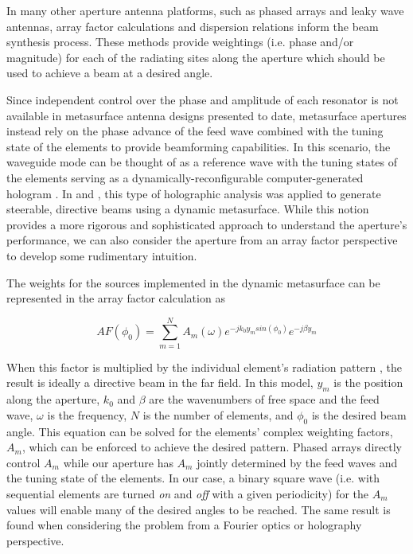 \documentclass[journal]{IEEEtran}
\begin{document}
In many other aperture antenna platforms, such as phased arrays and leaky wave antennas, array factor calculations \cite{balanis2005antenna} and dispersion relations \cite{oliner1993leaky} inform the beam synthesis process. These methods provide weightings (i.e. phase and/or magnitude) for each of the radiating sites along the aperture which should be used to achieve a beam at a desired angle.

Since independent control over the phase and amplitude of each resonator is not available in metasurface antenna designs presented to date, metasurface apertures instead rely on the phase advance of the feed wave combined with the tuning state of the elements to provide beamforming capabilities. In this scenario, the waveguide mode can be thought of as a reference wave with the tuning states of the elements serving as a dynamically-reconfigurable computer-generated hologram \cite{goodmanFourierOptics}. In \cite{johnson2015sidelobeCancel} and \cite{johnson2014DDA_ApOp}, this type of holographic analysis was applied to generate steerable, directive beams using a dynamic metasurface. While this notion provides a more rigorous and sophisticated approach to understand the aperture's performance, we can also consider the aperture from an array factor perspective to develop some rudimentary intuition.

The weights for the sources implemented in the dynamic metasurface can be represented in the array factor calculation as

\begin{equation}
AF(\phi_0) = \sum_{m=1}^N A_m(\omega) e^{-j k_0 y_m sin(\phi_0)} e^{-j \beta y_m} 
\end{equation}

\noindent When this factor is multiplied by the individual element's radiation pattern \cite{balanis2005antenna,Pulido-Mancera2016}, the result is ideally a directive beam in the far field. In this model, $y_m$ is the position along the aperture, $k_0$ and $\beta$ are the wavenumbers of free space and the feed wave, $\omega$ is the frequency, $N$ is the number of elements, and $\phi_0$ is the desired beam angle. This equation can be solved for the elements' complex weighting factors, $A_m$, which can be enforced to achieve the desired pattern. Phased arrays directly control $A_m$ while our aperture has $A_m$ jointly determined by the feed waves and the tuning state of the elements. In our case, a binary square wave (i.e. with sequential elements are turned \emph{on} and \emph{off} with a given periodicity) for the $A_m$ values will enable many of the desired angles to be reached. The same result is found when considering the problem from a Fourier optics or holography perspective.
\end{document}
